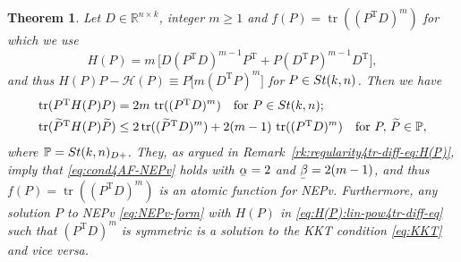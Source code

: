 \documentclass[11pt]{article}
\def\bbP{\mathbb{P}}
\def\bbR{\mathbb{R}}
\def\scrH{\mathscr{H}}
\def\wtd{\widetilde}
\newcommand\munderbar[1]{%
  \underaccent{\bar}{#1}}
\newcommand\STM[2]{{\rm St}(#1,#2)}
\DeclareMathOperator{\tr}{tr}
\DeclareMathOperator{\T}{T}
\newtheorem{theorem}{Theorem}[section]
\theoremstyle{definition}
\numberwithin{equation}{section}
\begin{document}
\begin{theorem}\label{thm:lin4tr-diff-eq:H(P)}
Let $D\in\bbR^{n\times k}$, integer $m\ge 1$  and $f(P)=\tr((P^{\T}D)^m)$ for which
we use
\begin{equation}\label{eq:H(P):lin-pow4tr-diff-eq}
H(P)=m\,\Big[D(P^{\T}D)^{m-1}P^{\T}+P(D^{\T}P)^{m-1}D^{\T}\Big],
\end{equation}
and thus $H(P)P-\scrH(P)\equiv P\big[m(D^{\T}P)^m\big]$ for $P\in\STM{k}{n}$.
Then we have
\begin{subequations}\label{eq:cond4set2-lin4tr-diff-eq:H(P)}
\begin{align}
\tr(P^{\T}H(P)P)
   &= 2m\, \tr((P^{\T}D)^m)\quad\mbox{for $P\in\STM{k}{n}$}; \label{eq:lin-pow4tr-diff-eq:H(P)} \\
\tr(\wtd P^{\T}H(P)\wtd P)
   &\le  2\tr((\wtd P^{\T}D)^m)+2(m-1)\,\tr((P^{\T}D)^m)
           \quad\mbox{for $P,\,\wtd P\in\bbP$},
           \label{eq:regularity4lin-pow4tr-diff-eq:H(P)}
\end{align}
\end{subequations}
where $\bbP=\STM{k}{n}_{D+}$. %
They, as argued in Remark~\ref{rk:regularity4tr-diff-eq:H(P)}, imply that \eqref{eq:cond4AF-NEPv} holds with $\munderbar\alpha=2$ and $\munderbar\beta=2(m-1)$,
and thus $f(P)=\tr((P^{\T}D)^m)$ is an atomic function for NEPv.
Furthermore, any solution $P$ to NEPv \eqref{eq:NEPv-form} with
$H(P)$ in \eqref{eq:H(P):lin-pow4tr-diff-eq} such that $(P^{\T}D)^m$ is symmetric is a solution to the KKT condition \eqref{eq:KKT} and vice versa.
\end{theorem}
\end{document}
